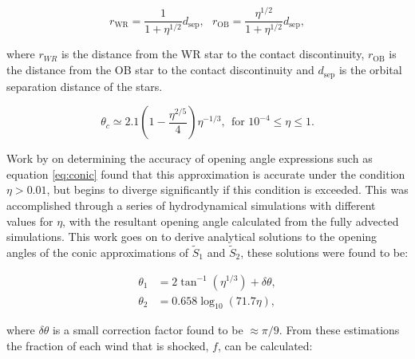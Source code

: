 \begin{equation}
  r_\text{WR} = \frac{1}{1+\eta^{1/2}} d_\text{sep} , ~~~ r_\text{OB} = \frac{\eta^{1/2}}{1+\eta^{1/2}} d_\text{sep} ,
\end{equation}

\noindent
where $r_{WR}$ is the distance from the WR star to the contact discontinuity, $r_\text{OB}$ is the distance from the OB star to the contact discontinuity and $d_\text{sep}$ is the orbital separation distance of the stars.



\begin{equation}
  \theta_c \simeq 2.1 \left(1 - \frac{\eta^{2/5}}{4}\right) \eta^{-1/3}, ~~ \text{for } 10^{-4} \leq \eta \leq 1. \label{eq:conic}
\end{equation}



\noindent
Work by \textcite{pittardCollidingStellarWinds2018} on determining the accuracy of opening angle expressions such as equation \ref{eq:conic} found that this approximation is accurate under the condition $\eta > 0.01$, but begins to diverge significantly if this condition is exceeded.
This was accomplished through a series of hydrodynamical simulations with different values for $\eta$, with the resultant opening angle calculated from the fully advected simulations.
This work goes on to derive analytical solutions to the opening angles of the conic approximations of $\widetilde{S}_1$ and $\widetilde{S}_2$, these solutions were found to be:

\begin{subequations}
  \begin{align}
    \theta_1 & = 2 \tan^{-1} \left(\eta^{1/3}\right) + \delta \theta , \\
    \theta_2 & = 0.658 \log_{10} \left(71.7 \eta \right) ,
  \end{align}
\end{subequations}

\noindent
where $\delta \theta$ is a small correction factor found to be $\approx \pi/9$.
From these estimations the fraction of each wind that is shocked, $f$, can be calculated:

